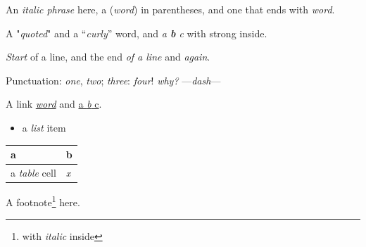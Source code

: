 An \emph{italic phrase} here, a (\emph{word}) in parentheses, and one that ends with \emph{word}.

A "\emph{quoted}" and a “\emph{curly}” word, and \emph{a \textbf{b} c} with strong inside.

\emph{Start} of a line,
and the end \emph{of a line}
and \emph{again}.

Punctuation: \emph{one}, \emph{two}; \emph{three}: \emph{four}! \emph{why?} —\emph{dash}—

A link \href{http://x.com}{\emph{word}} and \href{http://x.com}{a \emph{b} c}.

\begin{itemize}
\item a \emph{list} item
\end{itemize}

\begin{tabular}{ll}
\toprule
a & b \\
\midrule
a \emph{table} cell & \emph{x} \\
\bottomrule
\end{tabular}

A footnote\footnote{with \emph{italic} inside} here.


